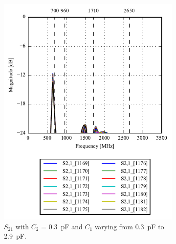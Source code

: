 \begin{figure}[htbp]
\begin{subfigure}[b]{0.49\linewidth}
        \includegraphics{img/tech_sol/monopole/play_mode/s21_s11}
        \caption{$S_{21}$ with $C_2$ = \SI{0.3}{pF} and $C_1$ varying from \SI{0.3}{pF} to \SI{2.9}{pF}.}
        \label{fig:ant1_s11}
    \end{subfigure}
    \hfill
    \begin{subfigure}[b]{0.49\linewidth}
        \centering

\end{subfigure}
\end{figure}
